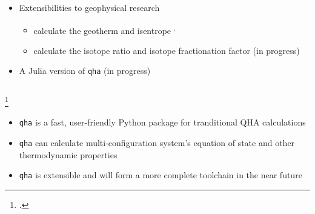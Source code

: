 \documentclass[13pt,aspectratio=169]{beamer}
\begin{document}
\begin{frame}{\subsecname}
\begin{columns}
		\begin{column}{0.45\textwidth}
			\begin{itemize}[<+(1)->]
				\item Extensibilities to geophysical research
				      \begin{itemize}
					      \item calculate the geotherm and isentrope \footnotemark\textsuperscript{,}\footnotemark
					      \item calculate the isotope ratio and isotope fractionation factor (in progress)
				      \end{itemize}
				\item A Julia version of \texttt{qha} (in progress)
			\end{itemize}
		\end{column}
	\end{columns}
	\setcounter{footnote}{8}
	\footcitetext{Cardona:2017dd}
\end{frame}

\begin{frame}{\secname}
	\begin{itemize}[<+(1)->]
		\setlength\itemsep{1em}
		\item \texttt{qha} is a fast, user-friendly Python package for tranditional QHA calculations
		\item \texttt{qha} can calculate multi-configuration system's equation of state and other thermodynamic properties
		\item \texttt{qha} is extensible and will form a more complete toolchain in the near future
	\end{itemize}
\end{frame}
\end{document}
